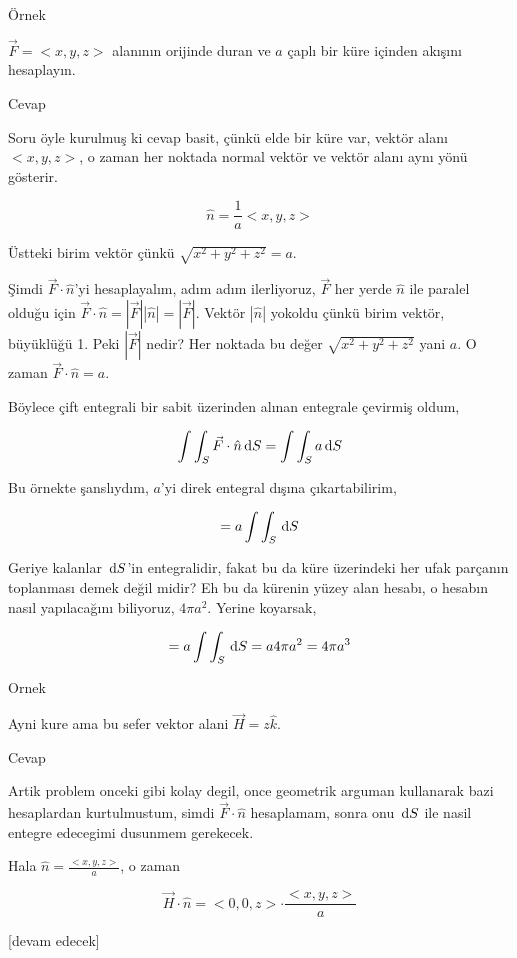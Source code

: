 \documentclass[12pt,fleqn]{article}\usepackage{../../common}
\begin{document}
Örnek

$\vec{F} = < x,y,z >$ alanının orijinde duran ve $a$ çaplı bir küre içinden
akışını hesaplayın.

Cevap

Soru öyle kurulmuş ki cevap basit, çünkü elde bir küre var, vektör alanı
$< x,y,z >$, o zaman her noktada normal vektör ve vektör alanı aynı yönü gösterir.

$$
\hat{n} = \frac{1}{a} < x,y,z >
$$

Üstteki birim vektör çünkü $\sqrt{x^2 + y^2 + z^2} = a$.

Şimdi $\vec{F} \cdot \hat{n}$'yi hesaplayalım, adım adım ilerliyoruz,
$\vec{F}$ her yerde $\hat{n}$ ile paralel olduğu için
$\vec{F} \cdot \hat{n} = |\vec{F}| |\hat{n}| = |\vec{F}|$. Vektör $|\hat{n}|$
yokoldu çünkü birim vektör, büyüklüğü 1. Peki $|\vec{F}|$ nedir? Her
noktada bu değer $\sqrt{x^2 + y^2 + z^2}$ yani $a$. O zaman
$\vec{F} \cdot \hat{n} = a$.

Böylece çift entegrali bir sabit üzerinden alınan entegrale çevirmiş oldum,

$$
\int \int_S \vec{F} \cdot \hat{n} \,\mathrm{d} S =
\int \int_S a \,\mathrm{d} S
$$

Bu örnekte şanslıydım, $a$'yi direk entegral dışına çıkartabilirim,

$$
= a \int \int_S \,\mathrm{d} S
$$

Geriye kalanlar $\,\mathrm{d} S$'in entegralidir, fakat bu da küre üzerindeki her ufak
parçanın toplanması demek değil midir? Eh bu da kürenin yüzey alan hesabı, o
hesabın nasıl yapılacağını biliyoruz, $4 \pi a^2$. Yerine koyarsak,

$$
= a \int \int_S \,\mathrm{d} S = a 4 \pi a^2 = 4 \pi a^3
$$

Ornek

Ayni kure ama bu sefer vektor alani $\vec{H} = z \hat{k}$.

Cevap

Artik problem onceki gibi kolay degil, once geometrik arguman kullanarak bazi
hesaplardan kurtulmustum, simdi $\vec{F} \cdot \hat{n}$ hesaplamam, sonra onu
$\,\mathrm{d} S$ ile nasil entegre edecegimi dusunmem gerekecek.

Hala $\hat{n} = \frac{ < x,y,z >}{a}$, o zaman

$$
\vec{H} \cdot \hat{n} = < 0,0,z > \cdot \frac{ < x,y,z >}{a}
$$















[devam edecek]
\end{document}
